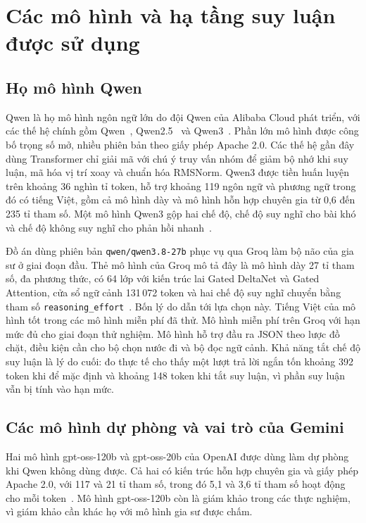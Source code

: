 \section{Các mô hình và hạ tầng suy luận được sử dụng}

\subsection{Họ mô hình Qwen}
Qwen là họ mô hình ngôn ngữ lớn do đội Qwen của Alibaba Cloud phát triển, với các thế hệ chính gồm Qwen~\cite{qwen2023}, Qwen2.5~\cite{qwen25} và Qwen3~\cite{qwen3}. Phần lớn mô hình được công bố trọng số mở, nhiều phiên bản theo giấy phép Apache 2.0. Các thế hệ gần đây dùng Transformer chỉ giải mã với chú ý truy vấn nhóm để giảm bộ nhớ khi suy luận, mã hóa vị trí xoay và chuẩn hóa RMSNorm. Qwen3 được tiền huấn luyện trên khoảng 36 nghìn tỉ token, hỗ trợ khoảng 119 ngôn ngữ và phương ngữ trong đó có tiếng Việt, gồm cả mô hình dày và mô hình hỗn hợp chuyên gia từ 0,6 đến 235 tỉ tham số. Một mô hình Qwen3 gộp hai chế độ, chế độ suy nghĩ cho bài khó và chế độ không suy nghĩ cho phản hồi nhanh~\cite{qwen3}.

Đồ án dùng phiên bản \texttt{qwen/qwen3.8-27b} phục vụ qua Groq làm bộ não của gia sư ở giai đoạn đầu. Thẻ mô hình của Groq mô tả đây là mô hình dày 27 tỉ tham số, đa phương thức, có 64 lớp với kiến trúc lai Gated DeltaNet và Gated Attention, cửa sổ ngữ cảnh 131\,072 token và hai chế độ suy nghĩ chuyển bằng tham số \texttt{reasoning\_effort}~\cite{groqdocs}. Bốn lý do dẫn tới lựa chọn này. Tiếng Việt của mô hình tốt trong các mô hình miễn phí đã thử. Mô hình miễn phí trên Groq với hạn mức đủ cho giai đoạn thử nghiệm. Mô hình hỗ trợ đầu ra JSON theo lược đồ chặt, điều kiện cần cho bộ chọn nước đi và bộ đọc ngữ cảnh. Khả năng tắt chế độ suy luận là lý do cuối: đo thực tế cho thấy một lượt trả lời ngắn tốn khoảng 392 token khi để mặc định và khoảng 148 token khi tắt suy luận, vì phần suy luận vẫn bị tính vào hạn mức.

\subsection{Các mô hình dự phòng và vai trò của Gemini}
Hai mô hình gpt-oss-120b và gpt-oss-20b của OpenAI được dùng làm dự phòng khi Qwen không dùng được. Cả hai có kiến trúc hỗn hợp chuyên gia và giấy phép Apache 2.0, với 117 và 21 tỉ tham số, trong đó 5,1 và 3,6 tỉ tham số hoạt động cho mỗi token~\cite{gptoss2025}. Mô hình gpt-oss-120b còn là giám khảo trong các thực nghiệm, vì giám khảo cần khác họ với mô hình gia sư được chấm.

